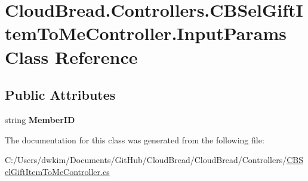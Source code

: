 \hypertarget{a00110}{}\section{Cloud\+Bread.\+Controllers.\+C\+B\+Sel\+Gift\+Item\+To\+Me\+Controller.\+Input\+Params Class Reference}
\label{a00110}
\subsection*{Public Attributes}
\begin{DoxyCompactItemize}
\item 
string {\bfseries Member\+ID}\hypertarget{a00110_adecba5ea79e54e571b0515229cd0b02f}{}\label{a00110_adecba5ea79e54e571b0515229cd0b02f}

\end{DoxyCompactItemize}


The documentation for this class was generated from the following file\+:\begin{DoxyCompactItemize}
\item 
C\+:/\+Users/dwkim/\+Documents/\+Git\+Hub/\+Cloud\+Bread/\+Cloud\+Bread/\+Controllers/\hyperlink{a00218}{C\+B\+Sel\+Gift\+Item\+To\+Me\+Controller.\+cs}\end{DoxyCompactItemize}
